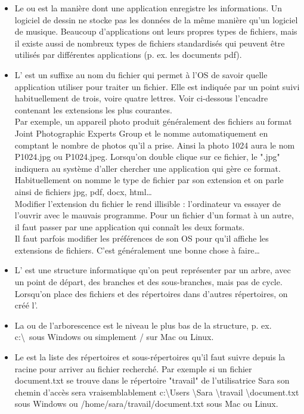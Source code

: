 \documentclass[10pt,a4paper]{report}
\begin{document}
\begin{itemize}
	\item Le  ou  est la manière dont une application enregistre les informations. Un logiciel de dessin ne stocke pas les données de la même manière qu'un logiciel de musique. Beaucoup d'applications ont leurs propres types de fichiers, mais il existe aussi de nombreux types de fichiers standardisés qui peuvent être utilisés par différentes applications (p. ex. les documents pdf).
	\item L' est un suffixe au nom du fichier qui permet à l'OS de savoir quelle application utiliser pour traiter un fichier. Elle est indiquée par un point suivi habituellement de trois, voire quatre lettres. Voir ci-dessous l'encadre contenant les extensions les plus courantes. \\[1ex]
		Par exemple, un appareil photo produit généralement des fichiers au format Joint Photographic Experts Group et le nomme automatiquement en comptant le nombre de photos qu'il a prise. Ainsi la photo 1024 aura le nom P1024.jpg ou P1024.jpeg. Lorsqu'on double clique sur ce fichier, le ".jpg" indiquera au système d'aller chercher une application qui gère ce format. \\[1ex]
		Habituellement on nomme le type de fichier par son extension et on parle ainsi de fichiers jpg, pdf, docx, html\dots \\[1ex]
		\attention Modifier l'extension du fichier le rend illisible : l'ordinateur va essayer de l'ouvrir avec le mauvais programme. Pour  un fichier d'un format à un autre, il faut passer par une application qui connaît les deux formats. \\[1ex]
		\attention Il faut parfois modifier les préférences de son OS pour qu'il affiche les extensions de fichiers. C'est généralement une bonne chose à faire\dots
	\item L' est une structure informatique qu'on peut représenter par un arbre, avec un point de départ, des branches et des sous-branches, mais pas de cycle. Lorsqu'on place des fichiers et des répertoires dans d'autres répertoires, on créé l'.
	\item La  ou  de l'arborescence est le niveau le plus bas de la structure, p. ex. c:\textbackslash \ sous Windows ou simplement / sur Mac ou Linux.
	\item Le  est la liste des répertoires et sous-répertoires qu'il faut suivre depuis la racine pour arriver au fichier recherché. Par exemple si un fichier document.txt se trouve dans le répertoire "travail" de l'utilisatrice Sara son chemin d'accès sera vraisemblablement c:\textbackslash Users \textbackslash Sara \textbackslash travail \textbackslash document.txt sous Windows ou /home/sara/travail/document.txt sous Mac ou Linux.
\end{itemize}
\end{document}
